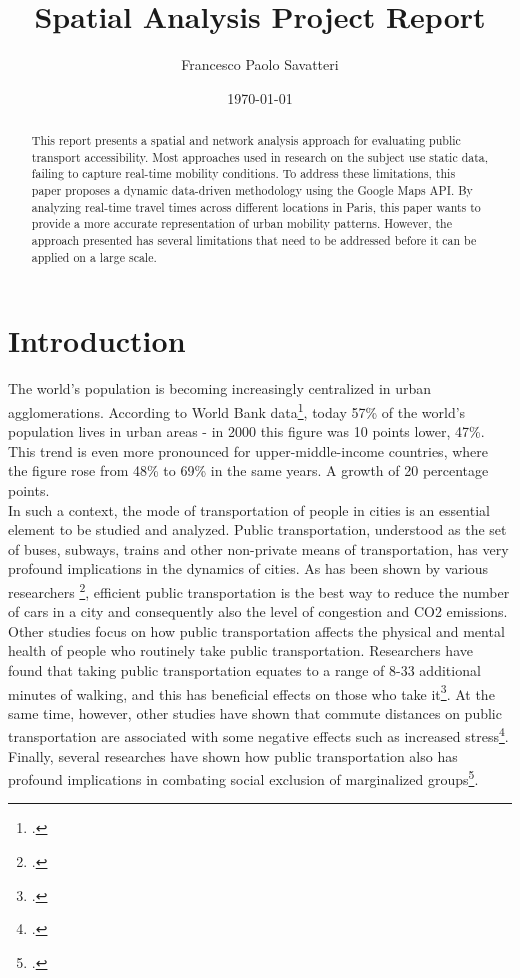 \documentclass[a4paper,12pt]{article}
\title{Spatial Analysis Project Report}
\author{Francesco Paolo Savatteri}
\date{\today}
\begin{document}
	
	\maketitle
	
	\vspace{2em}
	
	\begin{abstract}
This report presents a spatial and network analysis approach for evaluating public transport accessibility. Most approaches used in research on the subject use static data, failing to capture real-time mobility conditions.
To address these limitations, this paper proposes a dynamic data-driven methodology using the Google Maps API. By analyzing real-time travel times across different locations in Paris, this paper wants to provide a more accurate representation of urban mobility patterns. However, the approach presented has several limitations that need to be addressed before it can be applied on a large scale.
	\end{abstract}

\pagebreak

\tableofcontents

\newpage

\section{Introduction}
The world's population is becoming increasingly centralized in urban agglomerations. According to World Bank data\footcite{worldbank_data}, today 57\% of the world's population lives in urban areas - in 2000 this figure was 10 points lower, 47\%. This trend is even more pronounced for upper-middle-income countries, where the figure rose from 48\% to 69\% in the same years. A growth of 20 percentage points. \\

In such a context, the mode of transportation of people in cities is an essential element to be studied and analyzed. Public transportation, understood as the set of buses, subways, trains and other non-private means of transportation, has very profound implications in the dynamics of cities. As has been shown by various researchers \footcite{verbavatz2019}, efficient public transportation is the best way to reduce the number of cars in a city and consequently also the level of congestion and CO2 emissions.\\
Other studies focus on how public transportation affects the physical and mental health of people who routinely take public transportation. Researchers have found that taking public transportation equates to a range of 8-33 additional minutes of walking, and this has beneficial effects on those who take it\footcite{rissel2012}. At the same time, however, other studies have shown that commute distances on public transportation are associated with some negative effects such as increased stress\footcite{norgate2020}. \\
Finally, several researches have shown how public transportation also has profound implications in combating social exclusion of marginalized groups\footcite{hine2017}. \\
\end{document}
